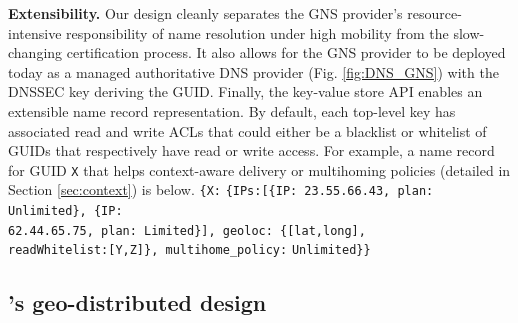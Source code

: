 
{\bf{Extensibility.}} Our design cleanly separates the GNS provider's resource-intensive responsibility of name resolution under high mobility from the slow-changing certification process. It also allows for the GNS provider to be deployed today as a managed authoritative DNS provider (Fig. \ref{fig:DNS_GNS}) with the DNSSEC key deriving the GUID. Finally, the key-value store API enables an extensible name record representation. By default, each top-level key has associated read and write ACLs that could either be a blacklist or whitelist of GUIDs that respectively have read or write access. For example, a name record for GUID \verb+X+ that helps context-aware delivery or multihoming policies (detailed in Section \ref{sec:context}) is below.
\verb+{X:+
\verb+{IPs:[{IP: 23.55.66.43, plan: Unlimited}, {IP:+\\
\verb+62.44.65.75, plan: Limited}], geoloc: {[lat,long],+\\
\verb+readWhitelist:[Y,Z]}, multihome_policy:+
\verb+Unlimited}}+



\subsection{\auspice's geo-distributed design}

